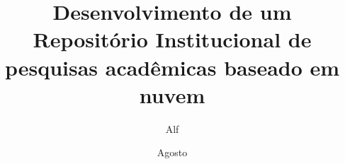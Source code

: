 \documentclass[diss]{template/setrem}
\title{Desenvolvimento de um Repositório Institucional de pesquisas acadêmicas baseado em nuvem}
\author{Alf}{Lucas Machado}
\date{Agosto}{2022}
\begin{document}
\maketitle
% 











\begin{singlespaced}
  \listoftables
\end{singlespaced}


\end{document}
